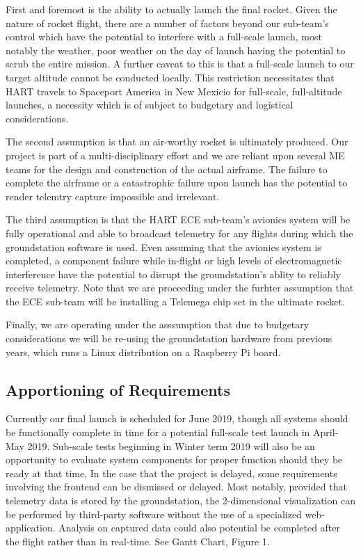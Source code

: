 \documentclass[onecolumn, draftclsnofoot,10pt, compsoc]{IEEEtran}
\begin{document}
			First and foremost is the ability to actually launch the final rocket. 
			Given the nature of rocket flight, there are a number of factors beyond our sub-team's control which have the potential to interfere with a full-scale launch, most notably the weather, poor weather on the day of launch having the potential to scrub the entire mission.
			A further caveat to this is that a full-scale launch to our target altitude cannot be conducted locally.
			This restriction necessitates that HART travels to Spaceport America in New Mexicio for full-scale, full-altitude launches, a necessity which is of subject to budgetary and logistical considerations.

			The second assumption is that an air-worthy rocket is ultimately produced.
			Our project is part of a multi-disciplinary effort and we are reliant upon several ME teams for the design and construction of the actual airframe.
			The failure to complete the airframe or a catastrophic failure upon launch has the potential to render telemtry capture impossible and irrelevant.
			
			The third assumption is that the HART ECE sub-team's avionics system will be fully operational and able to broadcast telemetry for any flights during which the groundstation software is used.
			Even assuming that the avionics system is completed, a component failure while in-flight or high levels of electromagnetic interference have the potential to disrupt the groundstation's ablity to reliably receive telemetry.
			Note that we are proceeding under the furhter assumption that the ECE sub-team will be installing a Telemega chip set in the ultimate rocket.
			
			Finally, we are operating under the asssumption that due to budgetary considerations we will be re-using the groundstation hardware from previous years, which runs a Linux distribution on a Raspberry Pi board.

		\subsection{Apportioning of Requirements}
			Currently our final launch is scheduled for June 2019, though all systems should be functionally complete in time for a potential full-scale test launch in April-May 2019.
			Sub-scale tests beginning in Winter term 2019 will also be an opportunity to evaluate system components for proper function should they be ready at that time,
			In the case that the project is delayed, some requirements involving the frontend can be dismissed or delayed. Most notably, provided that telemetry data is stored by the groundstation, the 2-dimensional visualization can be performed by third-party software without the use of a specialized web-application.
			Analysis on captured data could also potential be completed after the flight rather than in real-time.
			See Gantt Chart, Figure 1.
\end{document}

